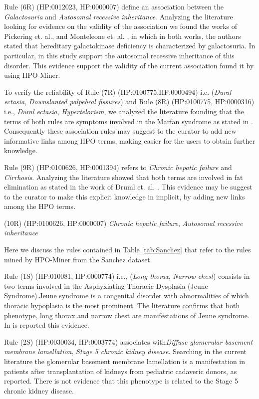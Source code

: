\documentclass{article}
\theoremstyle{definition}
\begin{document}
Rule (6R) (HP:0012023, HP:0000007) define an association between the   \textit{Galactosuria} and \textit{Autosomal recessive inheritance}. Analyzing the literature looking for evidence on the validity of the association we found the works of Pickering et. al., \cite{pickering1972galactokinase} and Monteleone et. al. \cite{monteleone1971cataracts}, in which in both works, the authors stated that hereditary galactokinase deficiency is characterized by galactosuria. In particular, in this study support the autosomal recessive inheritance of this disorder. This evidence support the validity of the current association found it by using HPO-Miner.

To verify the reliability of Rule (7R) (HP:0100775,HP:0000494) i.e. (\textit{Dural ectasia}, \textit{Downslanted palpebral fissures}) and Rule (8R) (HP:0100775, HP:0000316) i.e., \textit{Dural ectasia}, \textit{Hypertelorism}, we analyzed the literature founding that the terms of both rules are symptoms involved in the Marfan syndrome as stated in \cite{lemaire2007severe, loeys2010revised}. Consequently these association rules may suggest to the curator to add new informative links among HPO terms, making easier for the users to obtain further knowledge.


Rule (9R) (HP:0100626, HP:0001394) refers to \textit{Chronic hepatic failure} and \textit{Cirrhosis}. Analyzing the literature showed that both terms are involved in fat elimination as stated in the work of Druml et. al. \cite{druml1995fat}. This evidence may be suggest to the curator to make this explicit knowledge in implicit, by adding new links among the HPO terms.

 (10R) (HP:0100626, HP:0000007) \textit{Chronic hepatic failure}, \textit{Autosomal recessive inheritance}

Here we discuss the rules contained in Table \ref{tab:Sanchez} that refer to the rules mined by HPO-Miner from the Sanchez dataset.

Rule (1S) (HP:010081, HP:0000774) i.e.,  (\textit{Long thorax}, \textit{Narrow chest}) consists in two terms involved in the Asphyxiating Thoracic Dysplasia (Jeune Syndrome).Jeune syndrome is a congenital disorder with abnormalities of which thoracic hypoplasia is the most prominent. The literature confirms that both phenotype, long thorax and narrow chest are manifestations of Jeune syndrome. In \cite{elejalde1985prenatal} is reported this evidence.

Rule (2S) (HP:0030034, HP:0003774) associates  with\textit{Diffuse glomerular basement membrane lamellation}, \textit{Stage 5 chronic kidney disease}. Searching in the current literature the glomerular basement membrane lamellation is a manifestation in patients after transplantation of kidneys from pediatric cadaveric donors, as \cite{nadasdy1999diffuse} reported. There is not evidence that this phenotype is related to the Stage 5 chronic kidney disease.
\end{document}
